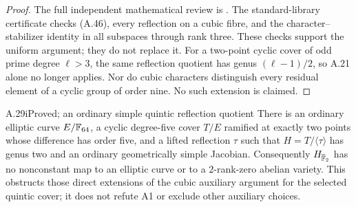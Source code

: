 \begin{proof}
The full independent mathematical review is
.
The standard-library certificate
checks (A.46), every reflection on a cubic fibre,
and the character--stabilizer identity in all
subspaces through rank three. These checks support
the uniform argument; they do not replace it.
For a two-point cyclic cover of odd prime degree
$\ell>3$, the same reflection quotient has genus
$(\ell-1)/2$, so A.21 alone no longer applies.
Nor do cubic characters distinguish every residual
element of a cyclic group of order nine. No such
extension is claimed.
\end{proof}

\begin{claim}{A.29i}{Proved; an ordinary simple quintic reflection quotient}
There is an ordinary elliptic curve $E/\mathbb F_{64}$, a cyclic
degree-five cover $T/E$ ramified at exactly two points
whose difference has order five, and a lifted reflection
$\tau$ such that $H=T/\langle\tau\rangle$ has genus two
and an ordinary geometrically simple Jacobian.
Consequently $H_{\overline{\mathbb F}_2}$ has no nonconstant map
to an elliptic curve or to a $2$-rank-zero abelian variety.
This obstructs those direct extensions of the cubic
auxiliary argument for the selected quintic cover; it
does not refute A1 or exclude other auxiliary choices.
\end{claim}
